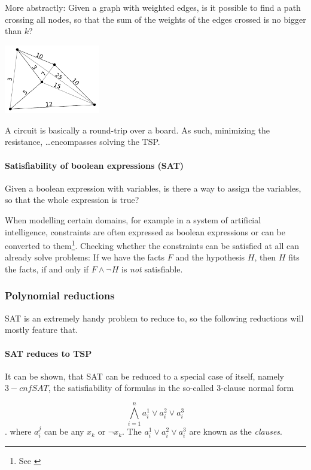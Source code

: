 More abstractly: Given a graph with weighted edges, is it possible to find a 
path crossing all nodes, so that the sum of the weights of the edges crossed 
is no bigger than $k$?
\begin{center}
	\includegraphics[height=3cm]{complexity/langcomplexity/pictures/tsp}
\end{center}
\begin{example}[Relevance]
	A circuit is basically a round-trip over a board. As such, minimizing 
	the resistance, \dots encompasses solving the TSP.
\end{example}

\paragraph{Satisfiability of boolean expressions (SAT)}
Given a boolean expression with variables, is there a way to assign the 
variables, so that the whole expression is true?
\begin{example}[Relevance]
	When modelling certain domains, for example in a system of artificial
	intelligence, constraints are often expressed as boolean expressions or can
	be converted to them\footnote{See \cite{russell1995artificial}}. Checking
	whether the constraints can be satisfied at all can already solve problems:
	If we have the facts $F$ and the hypothesis $H$, then $H$ fits the facts, if
	and only if $F\wedge\lnot H$ is \emph{not} satisfiable.
\end{example}
\subsubsection{Polynomial reductions}
SAT is an extremely handy problem to reduce to, so the following reductions 
will mostly feature that.
\paragraph{SAT reduces to TSP}
It can be shown, that SAT can be reduced to a special case of itself, namely 
$3-cnf SAT$, the satisfiability of formulas in the so-called 3-clause normal form

\[ \bigwedge_{i=1}^n a^1_i\vee a^2_i \vee a^3_i \].
where $a^j_i$ can be any $x_k$ or $\lnot x_k$. The 
$a^1_i\vee a^2_i \vee a^3_i$ are known as the \emph{clauses}.

